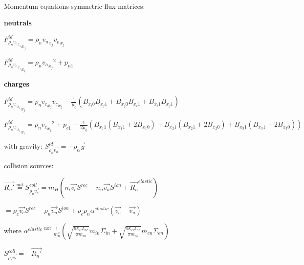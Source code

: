 \documentclass{beamer}
\begin{document}
\begin{frame}{Momentum equations}
symmetric flux matrices:

\textbf{neutrals}

${F_{\rho_{n}{v_n}_{x_i}}^{id}}_{x_j} = \rho_n {v_n}_{x_j} {v_n}_{x_j}  $ 

${F_{\rho_{n}{v_n}_{x_i}}^{id}}_{x_i} = \rho_n {{v_n}_{x_j}}^2 + p_{n1}  $

\textbf{charges}
 
${F_{\rho_{n}{v_c}_{x_i}}^{id}}_{x_j} = \rho_n {v_c}_{x_j} {v_c}_{x_j} - \frac{1}{\mu_0}(B_{x_i 0}B_{x_j 1} + B_{x_j0}B_{x_i1}  + B_{x_i1}B_{x_j1}  ) $ 

${F_{\rho_{n}{v_c}_{x_i}}^{id}}_{x_i} = \rho_n {{v_c}_{x_j}}^2 + p_{c1}  - \frac{1}{2 \mu_0}(B_{x_1 1} (B_{x_1 1} + 2  B_{x_1 0} )+ B_{x_2 1} (B_{x_2 1} + 2  B_{x_2 0} ) + B_{x_3 1} (B_{x_3 1} + 2  B_{x_3 0} ))$

with gravity: $S_{\rho_\alpha \vec{v_\alpha}}^{id} = -\rho_\alpha \vec{g}$

collision sources:

$\vec{R_n'} \stackrel{\text{not}}{=} S_{\rho_n \vec{v_n}}^{coll} =  m_H(n_i \vec{v_c} S^{rec} - n_n \vec{v_n} S^{ion} +\vec{R_n}^{elastic})$

$=\rho_c \vec{v_c} S^{rec} - \rho_n \vec{v_n} S^{ion} +\rho_c \rho_n \alpha^{elastic} (\vec{v_c} - \vec{v_n})$

where $\alpha^{elastic}\stackrel{\text{not}}{=} \frac{1}{m_n^2}(\sqrt{\frac{8 k_B T_{nc}}{\pi m_{in}}} m_{in} \Sigma_{in} +  \sqrt{\frac{8 k_B T_{nc}}{\pi m_{en}}} m_{en} \Sigma_{en})$ 


$S_{\rho_c \vec{v_c}}^{coll} =  -\vec{R_n'} $ 


\end{frame}
\end{document}
